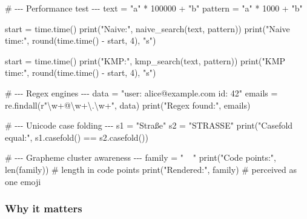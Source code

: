 \documentclass[
  letterpaper,
  DIV=11,
  numbers=noendperiod]{scrreprt}
\newenvironment{Shaded}{\begin{snugshade}}{\end{snugshade}}
\newcommand{\BuiltInTok}[1]{\textcolor[rgb]{0.00,0.23,0.31}{#1}}
\newcommand{\CharTok}[1]{\textcolor[rgb]{0.13,0.47,0.30}{#1}}
\newcommand{\CommentTok}[1]{\textcolor[rgb]{0.37,0.37,0.37}{#1}}
\newcommand{\DecValTok}[1]{\textcolor[rgb]{0.68,0.00,0.00}{#1}}
\newcommand{\NormalTok}[1]{\textcolor[rgb]{0.00,0.23,0.31}{#1}}
\newcommand{\OperatorTok}[1]{\textcolor[rgb]{0.37,0.37,0.37}{#1}}
\newcommand{\StringTok}[1]{\textcolor[rgb]{0.13,0.47,0.30}{#1}}
\newcommand{\VerbatimStringTok}[1]{\textcolor[rgb]{0.13,0.47,0.30}{#1}}
\begin{document}
\begin{Shaded}
\begin{Highlighting}[]
\CommentTok{\# {-}{-}{-} Performance test {-}{-}{-}}
\NormalTok{text }\OperatorTok{=} \StringTok{"a"} \OperatorTok{*} \DecValTok{100000} \OperatorTok{+} \StringTok{"b"}
\NormalTok{pattern }\OperatorTok{=} \StringTok{"a"} \OperatorTok{*} \DecValTok{1000} \OperatorTok{+} \StringTok{"b"}

\NormalTok{start }\OperatorTok{=}\NormalTok{ time.time()}
\BuiltInTok{print}\NormalTok{(}\StringTok{"Naive:"}\NormalTok{, naive\_search(text, pattern))}
\BuiltInTok{print}\NormalTok{(}\StringTok{"Naive time:"}\NormalTok{, }\BuiltInTok{round}\NormalTok{(time.time() }\OperatorTok{{-}}\NormalTok{ start, }\DecValTok{4}\NormalTok{), }\StringTok{"s"}\NormalTok{)}

\NormalTok{start }\OperatorTok{=}\NormalTok{ time.time()}
\BuiltInTok{print}\NormalTok{(}\StringTok{"KMP:"}\NormalTok{, kmp\_search(text, pattern))}
\BuiltInTok{print}\NormalTok{(}\StringTok{"KMP time:"}\NormalTok{, }\BuiltInTok{round}\NormalTok{(time.time() }\OperatorTok{{-}}\NormalTok{ start, }\DecValTok{4}\NormalTok{), }\StringTok{"s"}\NormalTok{)}

\CommentTok{\# {-}{-}{-} Regex engines {-}{-}{-}}
\NormalTok{data }\OperatorTok{=} \StringTok{"user: alice@example.com id: 42"}
\NormalTok{emails }\OperatorTok{=}\NormalTok{ re.findall(}\VerbatimStringTok{r"}\DecValTok{\textbackslash{}w}\OperatorTok{+}\VerbatimStringTok{@}\DecValTok{\textbackslash{}w}\OperatorTok{+}\CharTok{\textbackslash{}.}\DecValTok{\textbackslash{}w}\OperatorTok{+}\VerbatimStringTok{"}\NormalTok{, data)}
\BuiltInTok{print}\NormalTok{(}\StringTok{"Regex found:"}\NormalTok{, emails)}

\CommentTok{\# {-}{-}{-} Unicode case folding {-}{-}{-}}
\NormalTok{s1 }\OperatorTok{=} \StringTok{"Straße"}
\NormalTok{s2 }\OperatorTok{=} \StringTok{"STRASSE"}
\BuiltInTok{print}\NormalTok{(}\StringTok{"Casefold equal:"}\NormalTok{, s1.casefold() }\OperatorTok{==}\NormalTok{ s2.casefold())}

\CommentTok{\# {-}{-}{-} Grapheme cluster awareness {-}{-}{-}}
\NormalTok{family }\OperatorTok{=} \StringTok{"👨‍👩‍👧‍👦"}
\BuiltInTok{print}\NormalTok{(}\StringTok{"Code points:"}\NormalTok{, }\BuiltInTok{len}\NormalTok{(family))     }\CommentTok{\# length in code points}
\BuiltInTok{print}\NormalTok{(}\StringTok{"Rendered:"}\NormalTok{, family)             }\CommentTok{\# perceived as one emoji}
\end{Highlighting}
\end{Shaded}

\subsubsection{Why it matters}\label{why-it-matters-35}
\end{document}
